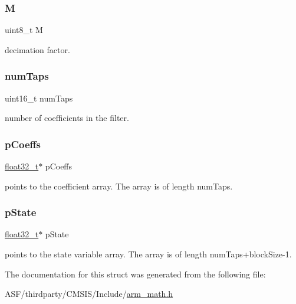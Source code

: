 \subsubsection{\texorpdfstring{M}{M}}
{\footnotesize\ttfamily uint8\+\_\+t M}

decimation factor. \mbox{\label{structarm__fir__decimate__instance__f32_a751941891e47f522a7f5375fe8990aac}} 
\subsubsection{\texorpdfstring{numTaps}{numTaps}}
{\footnotesize\ttfamily uint16\+\_\+t num\+Taps}

number of coefficients in the filter. \mbox{\label{structarm__fir__decimate__instance__f32_aacbb8dd8eeba4b21fc2bb40076405ee3}} 
\subsubsection{\texorpdfstring{pCoeffs}{pCoeffs}}
{\footnotesize\ttfamily \mbox{\hyperlink{arm__math_8h_a4611b605e45ab401f02cab15c5e38715}{float32\+\_\+t}}$\ast$ p\+Coeffs}

points to the coefficient array. The array is of length num\+Taps. \mbox{\label{structarm__fir__decimate__instance__f32_a335c87e6fdc4b96601d95a5de8b9c463}} 
\subsubsection{\texorpdfstring{pState}{pState}}
{\footnotesize\ttfamily \mbox{\hyperlink{arm__math_8h_a4611b605e45ab401f02cab15c5e38715}{float32\+\_\+t}}$\ast$ p\+State}

points to the state variable array. The array is of length num\+Taps+block\+Size-\/1. 

The documentation for this struct was generated from the following file\+:\begin{DoxyCompactItemize}
\item 
A\+S\+F/thirdparty/\+C\+M\+S\+I\+S/\+Include/\mbox{\hyperlink{arm__math_8h}{arm\+\_\+math.\+h}}\end{DoxyCompactItemize}
